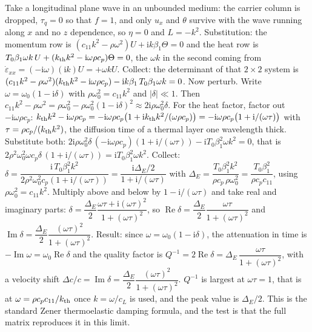\documentclass[11pt]{article}
\makeatletter
\newif\ifshowworked
\newenvironment{worked}{%
  \ifshowworked\par\smallskip\noindent\textit{Working.}\par\smallskip\else
  \setbox\z@\vbox\bgroup\fi}{\ifshowworked\par\smallskip\else\egroup\fi}
\newcommand{\ii}{\mathrm{i}}
\makeatother
\begin{document}
\begin{worked}
Take a longitudinal plane wave in an unbounded medium: the carrier column is dropped, $\tau_q=0$ so that
$f=1$, and only $u_x$ and $\theta$ survive with the wave running along $x$ and no $z$ dependence, so
$\eta=0$ and $L=-k^2$.
Substitution: the momentum row is $(c_{11}k^2-\rho\omega^2)U+\ii k\beta_1\Theta=0$ and the heat row is
$T_0\beta_1\omega k\,U+(k_{\rm th}k^2-\ii\omega\rho c_p)\Theta=0$, the $\omega k$ in the second coming
from $\dot\varepsilon_{xx}=(-\ii\omega)(\ii k)U=+\omega kU$.
Collect: the determinant of that $2\times2$ system is
$(c_{11}k^2-\rho\omega^2)(k_{\rm th}k^2-\ii\omega\rho c_p)-\ii k\beta_1\,T_0\beta_1\omega k=0$.
Now perturb. Write $\omega=\omega_0(1-\ii\delta)$ with $\rho\omega_0^2=c_{11}k^2$ and $|\delta|\ll1$.
Then $c_{11}k^2-\rho\omega^2=\rho\omega_0^2-\rho\omega_0^2(1-\ii\delta)^2\approx2\ii\rho\omega_0^2\delta$.
For the heat factor, factor out $-\ii\omega\rho c_p$:
$k_{\rm th}k^2-\ii\omega\rho c_p=-\ii\omega\rho c_p\bigl(1+\ii k_{\rm th}k^2/(\omega\rho c_p)\bigr)
=-\ii\omega\rho c_p\bigl(1+\ii/(\omega\tau)\bigr)$ with
$\tau=\rho c_p/(k_{\rm th}k^2)$, the diffusion time of a thermal layer one wavelength thick.
Substitute both:
$2\ii\rho\omega_0^2\delta\,(-\ii\omega\rho c_p)(1+\ii/(\omega\tau))-\ii T_0\beta_1^2\omega k^2=0$,
that is $2\rho^2\omega_0^2\omega c_p\delta\,(1+\ii/(\omega\tau))=\ii T_0\beta_1^2\omega k^2$.
Collect: $\delta=\dfrac{\ii\,T_0\beta_1^2k^2}{2\rho^2\omega_0^2c_p(1+\ii/(\omega\tau))}
=\dfrac{\ii\Delta_E/2}{1+\ii/(\omega\tau)}$ with
$\Delta_E=\dfrac{T_0\beta_1^2k^2}{\rho c_p\,\rho\omega_0^2}=\dfrac{T_0\beta_1^2}{\rho c_p c_{11}}$,
using $\rho\omega_0^2=c_{11}k^2$.
Multiply above and below by $1-\ii/(\omega\tau)$ and take real and imaginary parts:
$\delta=\dfrac{\Delta_E}{2}\dfrac{\omega\tau+\ii(\omega\tau)^2}{1+(\omega\tau)^2}$, so
$\operatorname{Re}\delta=\dfrac{\Delta_E}{2}\dfrac{\omega\tau}{1+(\omega\tau)^2}$ and
$\operatorname{Im}\delta=\dfrac{\Delta_E}{2}\dfrac{(\omega\tau)^2}{1+(\omega\tau)^2}$.
Result: since $\omega=\omega_0(1-\ii\delta)$, the attenuation in time is
$-\operatorname{Im}\omega=\omega_0\operatorname{Re}\delta$ and the quality factor is
$Q^{-1}=2\operatorname{Re}\delta=\Delta_E\,\dfrac{\omega\tau}{1+(\omega\tau)^2}$,
with a velocity shift $\Delta c/c=\operatorname{Im}\delta=\dfrac{\Delta_E}{2}\dfrac{(\omega\tau)^2}{1+(\omega\tau)^2}$.
$Q^{-1}$ is largest at $\omega\tau=1$, that is at $\omega=\rho c_pc_{11}/k_{\rm th}$ once $k=\omega/c_L$
is used, and the peak value is $\Delta_E/2$. This is the standard Zener thermoelastic damping formula,
and the test is that the full matrix reproduces it in this limit.
\end{worked}
\end{document}

